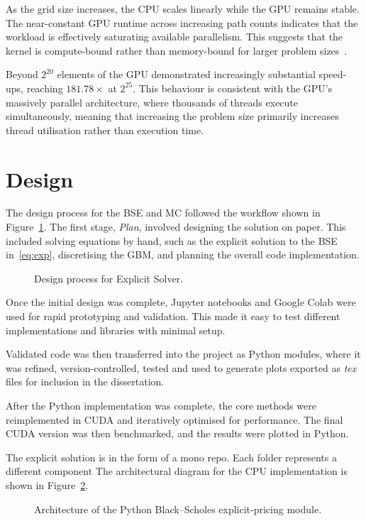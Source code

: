 \documentclass[11pt]{report}
\begin{document}
As the grid size increases, the CPU scales linearly
while the GPU remains stable. The near-constant GPU runtime 
across increasing path counts indicates that the workload
is effectively saturating available parallelism. 
This suggests that the kernel is compute-bound rather 
than memory-bound for larger problem sizes~\cite{crovella2020gpuperformance}.

Beyond $2^{20}$ elements of the GPU demonstrated increasingly substantial speed-ups, 
reaching $181.78\times$ at $2^{25}$.
This behaviour is consistent with the GPU's massively parallel 
architecture, where thousands of threads execute simultaneously,
meaning that increasing the problem size primarily increases 
thread utilisation rather than execution time. 

\section{Design}
The design process for the BSE and MC followed the workflow shown in Figure~\ref{fig:design_process}. The first stage, \textit{Plan}, 
involved designing the solution on paper. 
This included solving equations by hand, 
such as the explicit solution to the BSE 
in~\ref{eq:exp}, discretising the GBM, 
and planning the overall code implementation.
\begin{figure}[H]
    \centering
    \resizebox{0.72\textwidth}{!}{}
    \caption{Design process for Explicit Solver.}
    \label{fig:design_process}
\end{figure}

Once the initial design was complete, 
Jupyter notebooks and Google Colab were used for rapid 
prototyping and validation. This made it easy to test 
different implementations and libraries with minimal setup.

Validated code was then transferred into the project 
as Python modules, where it was refined, 
version-controlled, tested
and used to generate plots exported as \textit{tex} 
files for inclusion in the dissertation.

After the Python implementation was complete, 
the core methods were reimplemented in CUDA 
and iteratively optimised for performance. 
The final CUDA version was then benchmarked, 
and the results were plotted in Python.

The explicit solution is in the form of a mono repo.
Each folder represents a different component
The architectural diagram for the CPU implementation
is shown in Figure~\ref{fig:architecture}.
\begin{figure}[H]
  \centering
  \resizebox{0.95\textwidth}{!}{}
  \caption{Architecture of the Python Black--Scholes explicit-pricing module.}
  \label{fig:architecture}
\end{figure}
\end{document}
